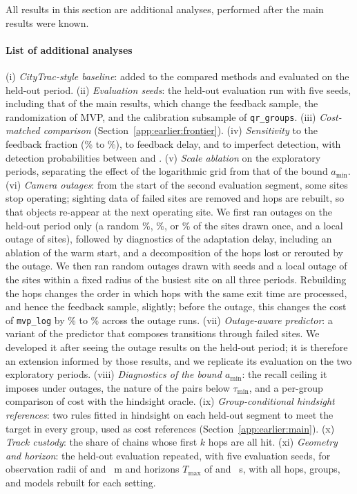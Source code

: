 All results in this section are additional analyses, performed after the main
results were known.

\paragraph*{List of additional analyses}
(i) \emph{CityTrac-style baseline}: added to the compared methods and evaluated on
the held-out period.
(ii) \emph{Evaluation seeds}: the held-out evaluation run with five seeds, including that of the main results, which change the feedback sample, the
randomization of MVP, and the calibration subsample of \texttt{qr\_groups}.
(iii) \emph{Cost-matched comparison} (Section~\ref{app:earlier:frontier}).
(iv) \emph{Sensitivity} to the feedback fraction (\sensFeedbackMinPct\% to \sensFeedbackMaxPct\%), to feedback delay,
and to imperfect detection, with detection probabilities between \sensDetLow and \sensDetHigh.
(v) \emph{Scale ablation} on the exploratory periods, separating the effect of the
logarithmic grid from that of the bound $a_{\min}$.
(vi) \emph{Camera outages}: from the start of the second evaluation segment, some
sites stop operating; sighting data of failed sites are removed and hops are
rebuilt, so that objects re-appear at the next operating site. We first ran
outages on the held-out period only (a random \initOutageRandLowPct\%, \initOutageRandMidPct\%, or \initOutageRandHighPct\% of the sites
drawn once, and a local outage of \initRegionSitesWord sites), followed by diagnostics of the
adaptation delay, including an ablation of the warm start, and a decomposition of
the hops lost or rerouted by the outage. We then ran random outages drawn with
\outageSiteSeedsWord seeds and a local outage of the \regionSites sites within a fixed radius of
the busiest site on all three periods. Rebuilding the hops changes the order in
which hops with the same exit time are processed, and hence the feedback sample,
slightly; before the outage, this changes the cost of \texttt{mvp\_log} by \outPreCostDiffMinPct\%
to \outPreCostDiffMaxPct\% across the outage runs.
(vii) \emph{Outage-aware predictor}: a variant of the predictor that composes
transitions through failed sites. We developed it after seeing the outage results
on the held-out period; it is therefore an extension informed by those results,
and we replicate its evaluation on the two exploratory periods.
(viii) \emph{Diagnostics of the bound $a_{\min}$}: the recall ceiling it imposes
under outages, the nature of the pairs below $\tau_{\min}$, and a per-group
comparison of cost with the hindsight oracle.
(ix) \emph{Group-conditional hindsight references}: two rules fitted in hindsight on
each held-out segment to meet the target in every group, used as cost references
(Section~\ref{app:earlier:main}).
(x) \emph{Track custody}: the share of chains whose first $k$ hops are all hit.
(xi) \emph{Geometry and horizon}: the held-out evaluation repeated, with five
evaluation seeds, for observation radii of \geomRadiusSmall and \geomRadiusLarge~m and horizons $T_{\max}$ of
\geomTmaxShort and \geomTmaxLong~s, with all hops, groups, and models rebuilt for each setting.

